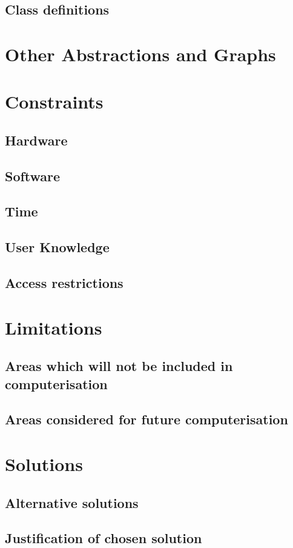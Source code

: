 \subsection{Class definitions}

\section{Other Abstractions and Graphs}

\section{Constraints}

\subsection{Hardware}

\subsection{Software}

\subsection{Time}

\subsection{User Knowledge}

\subsection{Access restrictions}

\section{Limitations}

\subsection{Areas which will not be included in computerisation}

\subsection{Areas considered for future computerisation}

\section{Solutions}

\subsection{Alternative solutions}

\subsection{Justification of chosen solution}